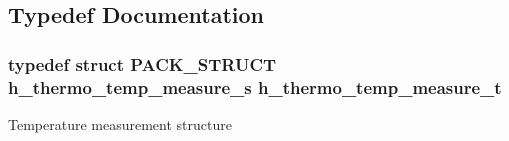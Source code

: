 \subsection{Typedef Documentation}
\hypertarget{group___enumeration_ga29b646d2e9db814fb80f36bfeeec82d1}{
\subsubsection[{h\-\_\-thermo\-\_\-temp\-\_\-measure\-\_\-t}]{\setlength{\rightskip}{0pt plus 5cm}typedef struct P\-A\-C\-K\-\_\-\-S\-T\-R\-U\-C\-T {\bf h\-\_\-thermo\-\_\-temp\-\_\-measure\-\_\-s} {\bf h\-\_\-thermo\-\_\-temp\-\_\-measure\-\_\-t}}}\label{group___enumeration_ga29b646d2e9db814fb80f36bfeeec82d1}
Temperature measurement structure 

